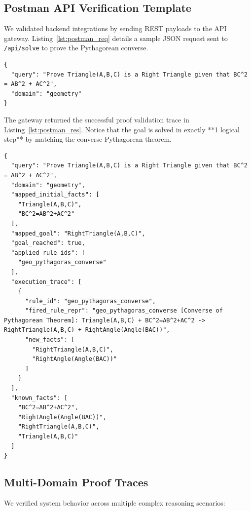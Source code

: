 \subsection{Postman API Verification Template}
We validated backend integrations by sending REST payloads to the API gateway. Listing~\ref{lst:postman_req} details a sample JSON request sent to \texttt{/api/solve} to prove the Pythagorean converse.

\begin{lstlisting}[style=jsonstyle, label={lst:postman_req}, caption={Postman request JSON payload sent to the API gateway at \texttt{/api/solve}.}]
{
  "query": "Prove Triangle(A,B,C) is a Right Triangle given that BC^2 = AB^2 + AC^2",
  "domain": "geometry"
}
\end{lstlisting}

The gateway returned the successful proof validation trace in Listing~\ref{lst:postman_res}. Notice that the goal is solved in exactly **1 logical step** by matching the converse Pythagorean theorem.

\begin{lstlisting}[style=jsonstyle, label={lst:postman_res}, caption={Postman response JSON returned by the backend, detailing the exact rule activation trace.}]
{
  "query": "Prove Triangle(A,B,C) is a Right Triangle given that BC^2 = AB^2 + AC^2",
  "domain": "geometry",
  "mapped_initial_facts": [
    "Triangle(A,B,C)",
    "BC^2=AB^2+AC^2"
  ],
  "mapped_goal": "RightTriangle(A,B,C)",
  "goal_reached": true,
  "applied_rule_ids": [
    "geo_pythagoras_converse"
  ],
  "execution_trace": [
    {
      "rule_id": "geo_pythagoras_converse",
      "fired_rule_repr": "geo_pythagoras_converse [Converse of Pythagorean Theorem]: Triangle(A,B,C) + BC^2=AB^2+AC^2 -> RightTriangle(A,B,C) + RightAngle(Angle(BAC))",
      "new_facts": [
        "RightTriangle(A,B,C)",
        "RightAngle(Angle(BAC))"
      ]
    }
  ],
  "known_facts": [
    "BC^2=AB^2+AC^2",
    "RightAngle(Angle(BAC))",
    "RightTriangle(A,B,C)",
    "Triangle(A,B,C)"
  ]
}
\end{lstlisting}

\subsection{Multi-Domain Proof Traces}
We verified system behavior across multiple complex reasoning scenarios:

